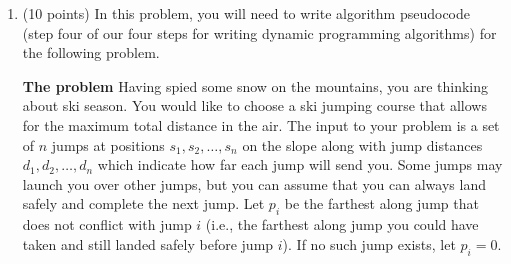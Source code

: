 \documentclass[11pt]{article}
\begin{document}
\begin{enumerate}
    Next, we think about the recursive relationship between subproblems. You notice that in order to make $i$,
    you could either have made $i-1$ and added a 1-coin, or made $i-3$ and added a 3-coin,
    or made $i-4$ and added a 4-coin. Using this observation, fill in the formal recursive
    definition for $MinCoins(i)$ below.

    \textbf{2. The recursive definition.} The recursive relationship can be expressed as:
    (fill in both recursive case(s) and base case(s). You may not need every line provided!)

    \begin{equation*}
        MinCoins(i) =
        \begin{cases}
        \underline{\hspace{3in}} & if i \underline{\hspace{1in}} \\
        \underline{\hspace{3in}} & if i \underline{\hspace{1in}} \\
        \underline{\hspace{3in}} & if i \underline{\hspace{1in}} \\
        \underline{\hspace{3in}} & if i \underline{\hspace{1in}} \\
        \underline{\hspace{3in}} & if i \underline{\hspace{1in}} \\
        \end{cases}
    \end{equation*}

    \item (10 points) In this problem, you will need to write algorithm pseudocode  
    (step four of our four steps for writing dynamic programming algorithms)
    for the following problem.

\textbf{The problem} Having spied some snow on the mountains, you are thinking
about ski season. You would like to choose a ski jumping course that allows for
the maximum total distance in the air. The input to your problem is a set of $n$
jumps at positions $s_1, s_2, \ldots, s_n$ on the slope along with jump
distances $d_1, d_2, \ldots, d_n$ which indicate how far each jump will send
you. Some jumps may launch you over other jumps, but you can assume that you can
always land safely and complete the next jump. Let $p_i$ be the farthest along jump
that does not conflict with jump $i$ (i.e., the farthest along jump you could have
taken and still landed safely before jump $i$). If no such jump exists, let $p_i = 0$.


\end{enumerate}
\end{document}
